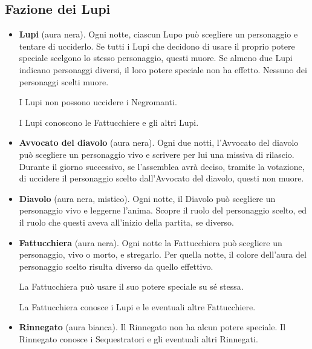 \documentclass[a4paper,10pt]{article}
\begin{document}
\subsection*{Fazione dei Lupi}

\begin{itemize}
 \item {\bf Lupi} (aura nera). Ogni notte, ciascun Lupo può scegliere un personaggio e tentare di ucciderlo.
 Se tutti i Lupi che decidono di usare il proprio potere speciale scelgono lo stesso personaggio, questi muore.
 Se almeno due Lupi indicano personaggi diversi, il loro potere speciale non ha effetto. Nessuno dei personaggi scelti muore.
 
 I Lupi non possono uccidere i Negromanti.
 
 I Lupi conoscono le Fattucchiere e gli altri Lupi.

 \item {\bf Avvocato del diavolo} (aura nera). Ogni due notti, l'Avvocato del diavolo può scegliere un personaggio vivo e scrivere per lui una missiva di rilascio.
 Durante il giorno successivo, se l'assemblea avrà deciso, tramite la votazione, di uccidere il personaggio scelto dall'Avvocato del diavolo, questi non muore.

 \item {\bf Diavolo} (aura nera, mistico). Ogni notte, il Diavolo può scegliere un personaggio vivo e leggerne l'anima. Scopre il ruolo del personaggio scelto, ed il ruolo che questi aveva all'inizio della partita, se diverso. %
 
 \item {\bf Fattucchiera} (aura nera). Ogni notte la Fattucchiera può scegliere un personaggio, vivo o morto, e stregarlo. Per quella notte, il colore dell'aura del personaggio scelto risulta diverso da quello effettivo.
 
 La Fattucchiera può usare il suo potere speciale su sé stessa.
 
 La Fattucchiera conosce i Lupi e le eventuali altre Fattucchiere.
 
 \item {\bf Rinnegato} (aura bianca). Il Rinnegato non ha alcun potere speciale. Il Rinnegato conosce i Sequestratori e gli eventuali altri Rinnegati.


\end{itemize}
\end{document}
